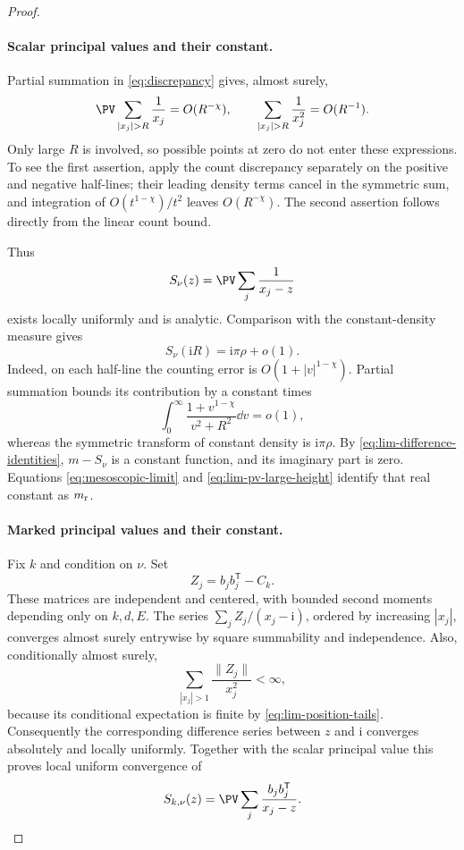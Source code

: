 \begin{proof}
\paragraph{Scalar principal values and their constant.}
Partial summation in \eqref{eq:discrepancy} gives, almost surely,
\begin{equation}\label{eq:lim-position-tails}
 \PV\sum_{|x_j|>R}\frac1{x_j}=O(R^{-\chi}),
 \qquad
 \sum_{|x_j|>R}\frac1{x_j^2}=O(R^{-1}).
\end{equation}
Only large \(R\) is involved, so possible points at zero do not
enter these expressions. To see the first assertion, apply the
count discrepancy separately on the positive and negative
half-lines; their leading density terms cancel in the symmetric
sum, and integration of \(O(t^{1-\chi})/t^2\) leaves
\(O(R^{-\chi})\). The second assertion follows directly from the
linear count bound.

Thus
\[
 S_\nu(z)=\PV\sum_j\frac1{x_j-z}
\]
exists locally uniformly and is analytic. Comparison with the
constant-density measure gives
\begin{equation}\label{eq:lim-pv-large-height}
 S_\nu(\mathrm i R)=\mathrm i\pi\rho+o(1).
\end{equation}
Indeed, on each half-line the counting error is
\(O(1+|v|^{1-\chi})\). Partial summation bounds its contribution
by a constant times
\[
 \int_0^\infty\frac{1+v^{1-\chi}}{v^2+R^2}\dd v=o(1),
\]
whereas the symmetric transform of constant density is
\(\mathrm i\pi\rho\).
By \eqref{eq:lim-difference-identities}, \(m-S_\nu\) is a constant
function, and its imaginary part is zero. Equations
\eqref{eq:mesoscopic-limit} and \eqref{eq:lim-pv-large-height}
identify that real constant as \(m_{\rm r}\).

\paragraph{Marked principal values and their constant.}
Fix \(k\) and condition on \(\nu\). Set
\[
 Z_j=b_jb_j^{\mathsf T}-C_k.
\]
These matrices are independent and centered, with bounded
second moments depending only on \(k,d,E\). The series
\(\sum_j Z_j/(x_j-\mathrm i)\), ordered by increasing \(|x_j|\),
converges almost surely entrywise by square summability and
independence. Also, conditionally almost surely,
\[
 \sum_{|x_j|>1}\frac{\|Z_j\|}{x_j^2}<\infty,
\]
because its conditional expectation is finite by
\eqref{eq:lim-position-tails}. Consequently the corresponding
difference series between \(z\) and \(\mathrm i\) converges
absolutely and locally uniformly. Together with the scalar
principal value this proves local uniform convergence of
\[
 S_{k,\nu}(z)=\PV\sum_j\frac{b_jb_j^{\mathsf T}}{x_j-z}.
\]


\end{proof}
